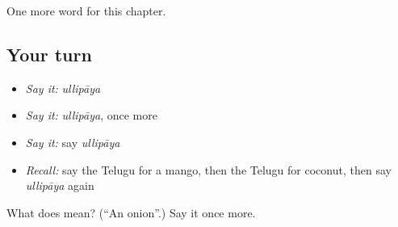 \begin{grammarlens}[title={What you've built}]
One more word for this chapter.
\end{grammarlens}

\subsection*{Your turn}
\begin{itemize}
\raggedright
  \item \emph{Say it:} \emph{ullipāya}
  \item \emph{Say it:} \emph{ullipāya}, once more
  \item \emph{Say it:} say \emph{ullipāya}
  \item \emph{Recall:} say the Telugu for a mango, then the Telugu for coconut, then say \emph{ullipāya} again
\end{itemize}

\begin{tcolorbox}[breakable,colback=teal!4,colframe=teal!35!black,title={Before you move on}]
What does  mean? (\textquotedblleft{}An onion\textquotedblright{}.) Say it once more.
\end{tcolorbox}
